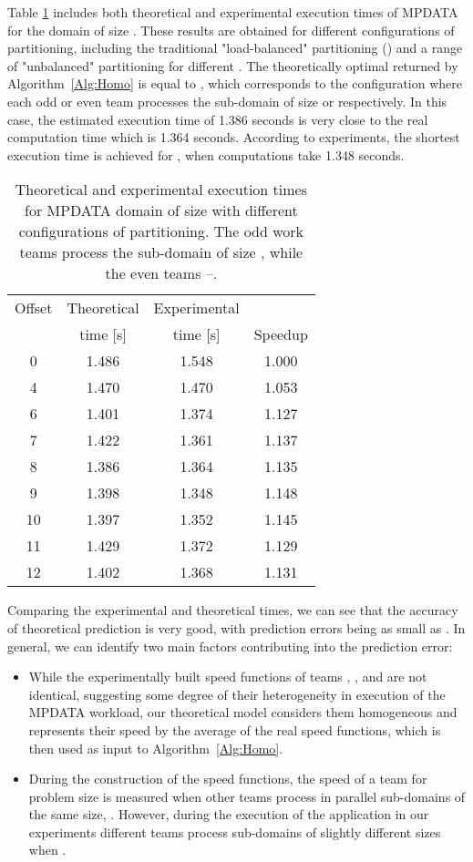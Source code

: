 \documentclass{acm_proc_article-sp}
\begin{document}
Table \ref{tab:240} includes both  theoretical and experimental execution times of MPDATA for  the domain of size .
These results are obtained for different configurations of partitioning, including the traditional "load-balanced" partitioning () and a range of "unbalanced" partitioning for different .
The theoretically optimal  returned by Algorithm~\ref{Alg:Homo} is equal to , which corresponds to the configuration where each odd or even team processes the sub-domain of size  or  respectively.
In this case, the estimated execution time of 1.386 seconds is very close to the real computation time which is 1.364 seconds. 
According to experiments, the shortest execution time is achieved for , when computations take 1.348 seconds. 
\begin{table}[h]
\caption{Theoretical and experimental execution times for MPDATA domain of size  with different configurations of partitioning.
The odd work teams process the sub-domain of size , while the even teams --.}
\label{tab:240}
\centering
\begin{tabular}{|c|c|c|c|}
\hline
Offset	&Theoretical	&	Experimental&		\\ 
	&time [s]	&	time [s]&	Speedup	\\ \hline
0	&	1.486	&	1.548	&	1.000	\\	\hline
4	&	1.470	&	1.470	&	1.053	\\	\hline
6	&	1.401	&	1.374	&	1.127	\\	\hline
7	&	1.422	&	1.361	&	1.137	\\	\hline
8	&	1.386	&	1.364	&	1.135	\\	\hline
9	&	1.398	&	1.348	&	1.148	\\	\hline
10	&	1.397	&	1.352	&	1.145	\\	\hline
11	&	1.429	&	1.372	&	1.129	\\	\hline
12	&	1.402	&	1.368	&	1.131	\\	\hline
\end{tabular}
\end{table}

Comparing the experimental and theoretical times, we can see that 
the accuracy of theoretical prediction is very good, with prediction errors being as small as . 
In general, we can identify 
two
main factors contributing into the prediction error:
\begin{itemize}
\item While the experimentally built speed functions of teams , ,  and  are not identical, suggesting some degree of their heterogeneity in execution of the MPDATA workload, our theoretical model  considers them homogeneous and represents their speed by the average of the real speed functions, which is then used as input to Algorithm~\ref{Alg:Homo}.
\item 
During the construction of the speed functions, the speed of a team for problem size  is measured when other teams process in parallel sub-domains of the same size, .  However, during the execution of the application in our experiments different teams process sub-domains of slightly different sizes when .
\end{itemize}
\end{document}

